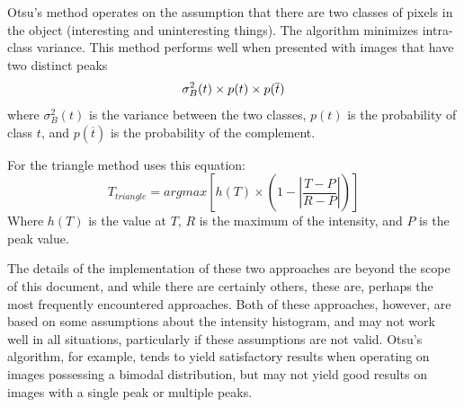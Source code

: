 \documentclass[agriculture,article,submit,pdftex,moreauthors]{Definitions/mdpi}
\begin{document}
%
Otsu's method operates on the assumption that there are two classes of pixels in the object (interesting and uninteresting things). The algorithm minimizes intra-class variance. This method performs well when presented with images that have two distinct peaks
\begin{equation}
\sigma^2_B (t) \times p(t) \times p(\overline{t}) \\
\end{equation}
where $\sigma^2_B (t)$ is the variance between the two classes, $p(t)$ is the probability of class $t$, and $p(\overline{t})$ is the probability of the complement.

For the triangle method uses this equation:
\begin{equation}
T_{triangle} = argmax \left[ h(T) \times \left( 1 - \left| \frac{T - P}{R - P} \right| \right) \right]
\end{equation}
Where $h(T)$ is the value at $T$, $R$ is the maximum of the intensity, and $P$ is the peak value.

The details of the implementation of these two approaches are beyond the scope of this document, and while there are certainly others, these are, perhaps the most frequently encountered approaches. Both of these approaches, however, are based on some assumptions about the intensity histogram, and may not work well in all situations, particularly if these assumptions are not valid. Otsu's algorithm, for example, tends to yield satisfactory results when operating on images possessing a bimodal distribution, but may not yield good results on images with a single peak or multiple peaks.
\end{document}
